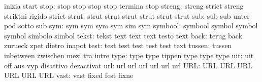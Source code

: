                            inizia                    start
                     stop: stop                      stop
                           stop                      stop
                           termina                   stop
                   streng: streng                    strict
                           streng                    striktni
                           rigido                    strict
                    strut: strut                     strut
                           strut                     strut
                           strut                     strut
                      sub: sub                       sub
                           unter                     pod
                           sotto                     sub
                      sym: sym                       sym
                           sym                       sym
                           sim                       sym
                  symbool: symbool                   symbol
                           symbol                    symbol
                           simbolo                   simbol
                    tekst: tekst                     text
                           text                      text
                           testo                     text
                     back: terug                     back
                           zurueck                   zpet
                           dietro                    inapot
                     test: test                      test
                           test                      test
                           test                      text
                   tussen: tussen                    inbetween
                           zwischen                  mezi
                           tra                       intre
                     type: type                      type
                           tippen                    type
                           type                      type %
                      uit: uit                       off
                           aus                       vyp
                           disattivo                 dezactivat
                      url: url                       url
                           url                       url
                           url                       url
                      URL: URL                       URL
                           URL                       URL
                           URL                       URL
                     vast: vast                      fixed
                           fest                      fixne
